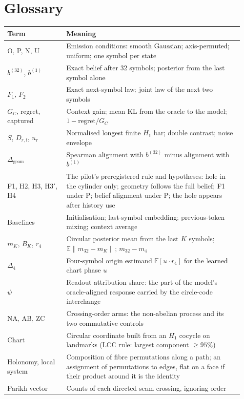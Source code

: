 \documentclass[11pt,a4paper]{article}
\newcommand{\bel}[1]{b^{(#1)}}
\newcommand{\GC}{G_{C}}
\newcommand{\dgeom}{\Delta_{\mathrm{geom}}}
\newcommand{\E}{\mathbb{E}}
\DeclareRobustCommand{\_}{\ifmmode\origunderscore\else\textunderscore\allowbreak\fi}
\newcommand{\Hp}{H3$'$}
\begin{document}
\clearpage
\appendix
\section{Glossary}\label{app:glossary}
\begin{longtable}{@{}L{0.24\linewidth}L{0.72\linewidth}@{}}
\toprule
Term & Meaning\\
\midrule\endhead
O, P, N, U & Emission conditions: smooth Gaussian; axis-permuted; uniform; one symbol per state\\
$\bel{32}$, $\bel{1}$ & Exact belief after 32 symbols; posterior from the last symbol alone\\
$F_1$, $F_2$ & Exact next-symbol law; joint law of the next two symbols\\
$\GC$, regret, captured & Context gain; mean KL from the oracle to the model; $1-\mathrm{regret}/\GC$\\
$S$, $D_{r,i}$, $u_r$ & Normalised longest finite $H_1$ bar; double contrast; noise envelope\\
$\dgeom$ & Spearman alignment with $\bel{32}$ minus alignment with $\bel{1}$\\
F1, H2, H3, \Hp, H4 & The pilot's preregistered rule and hypotheses: hole in the cylinder only; geometry follows the full belief; F1 under P; belief alignment under P; the hole appears after history use\\
Baselines & Initialisation; last-symbol embedding; previous-token mixing; context average\\
$m_K$, $B_K$, $r_4$ & Circular posterior mean from the last $K$ symbols; $\E\|m_{32}-m_K\|$; $m_{32}-m_4$\\
$\Delta_4$ & Four-symbol origin estimand $\E[u\cdot r_4]$ for the learned chart phase $u$\\
$\psi$ & Readout-attribution share: the part of the model's oracle-aligned response carried by the circle-code interchange\\
NA, AB, ZC & Crossing-order arms: the non-abelian process and its two commutative controls\\
Chart & Circular coordinate built from an $H_1$ cocycle on landmarks (LCC rule: largest component $\ge95\%$)\\
Holonomy, local system & Composition of fibre permutations along a path; an assignment of permutations to edges, flat on a face if their product around it is the identity\\
Parikh vector & Counts of each directed seam crossing, ignoring order\\

\end{longtable}
\end{document}
